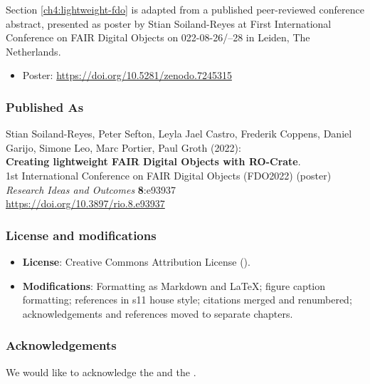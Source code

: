 Section \vref{ch4:lightweight-fdo} is adapted from a published peer-reviewed conference abstract,
presented as poster by Stian Soiland-Reyes at 
First International Conference on FAIR Digital Objects 
 on
022-08-26/--28 in Leiden, The Netherlands. 

\begin{itemize}
\item
  Poster: \url{https://doi.org/10.5281/zenodo.7245315}
\end{itemize}

\subsubsection*{Published As}
Stian Soiland-Reyes, Peter Sefton, Leyla Jael Castro, Frederik Coppens,
Daniel Garijo, Simone Leo, Marc Portier, Paul Groth (2022):\\
\textbf{Creating lightweight FAIR Digital Objects with RO-Crate}.\\
1st International Conference on FAIR Digital Objects (FDO2022) (poster)\\
\emph{Research Ideas and Outcomes} \textbf{8}:e93937\\
\url{https://doi.org/10.3897/rio.8.e93937}


\subsubsection*{License and modifications}

\begin{itemize}
\tightlist
\item
  \textbf{License}: Creative Commons Attribution License
  ().
\item
  \textbf{Modifications}: Formatting as Markdown and LaTeX; figure caption
  formatting; references in s11 house style; citations merged and renumbered; 
  acknowledgements and references moved to separate chapters.
\end{itemize}

\subsubsection*{Acknowledgements}

We would like to acknowledge the
 and the
.

